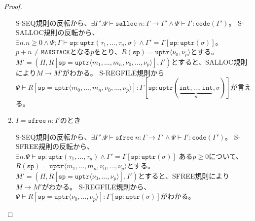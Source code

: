 \documentclass[a4paper,oneside]{ltjsarticle}
\newcommand{\code}[1]{\mathtt{code}(#1)}
\newcommand{\uptr}[1]{\mathtt{uptr}(#1)}
\newcommand{\vuptr}[1]{\mathtt{uptr}\langle #1\rangle}
\newcommand{\salloc}[1]{\mathtt{salloc}\ #1}
\newcommand{\sfree}[1]{\mathtt{sfree}\ #1}
\newcommand{\Tint}{\mathtt{int}}
\newcommand{\Tsp}{\mathtt{sp}}
\begin{document}
\begin{proof}
\begin{enumerate}
            S-SEQ規則の反転から、$\exists\Gamma'.\Psi\vdash \salloc{n}:\Gamma\rightarrow\Gamma' \wedge \Psi\vdash I':\code{\Gamma'}$。
            S-SALLOC規則の反転から、$\exists n.n\geq 0 \wedge \Psi;\Gamma\vdash \Tsp:\uptr{\tau_1,\dots,\tau_n,\sigma}\wedge \Gamma'=\Gamma[\Tsp:\uptr{\sigma}]$。
            $p+n\neq \mathtt{MAXSTACK}$となる$p$をとり、$R(\Tsp)=\vuptr{\nu_0,\nu_p}$とする。
            $M'=(H,R[\Tsp=\vuptr{m_1,\dots,m_n,\nu_0,\dots,\nu_p}],I')$とすると、SALLOC規則により$M\rightarrow M'$がわかる。
            S-REGFILE規則から$\Psi\vdash R[\Tsp=\vuptr{m_0,\dots,m_n,\nu_0,\dots,\nu_p}]:\Gamma[\Tsp:\uptr{\underbrace{\Tint,\dots,\Tint}_n,\sigma}]$が言える。
        \item $I=\sfree{n};I'$のとき

            S-SEQ規則の反転から、$\exists\Gamma'. \Psi\vdash \sfree{n}:\Gamma\rightarrow \Gamma'\wedge \Psi\vdash I':\code{\Gamma'}$。
            S-SFREE規則の反転から、$\exists n.\Psi\vdash \Tsp:\uptr{\tau_1,\dots,\tau_n}\wedge \Gamma' =\Gamma[\Tsp:\uptr{\sigma}]$
            ある$p\geq 0$について、$R(\Tsp)=\vuptr{m_1,\dots,m_n,\nu_0,\dots,\nu_p}$とする。
            $M'=(H,R[\Tsp=\vuptr{\nu_0,\dots,\nu_p}], I')$とすると、SFREE規則により$M\rightarrow M'$がわかる。
            S-REGFILE規則から、$\Psi\vdash R[\Tsp=\vuptr{\nu_0,\dots,\nu_p}]:\Gamma[\Tsp:\uptr{\sigma}]$がわかる。
    \end{enumerate}
\end{proof}
\end{document}
